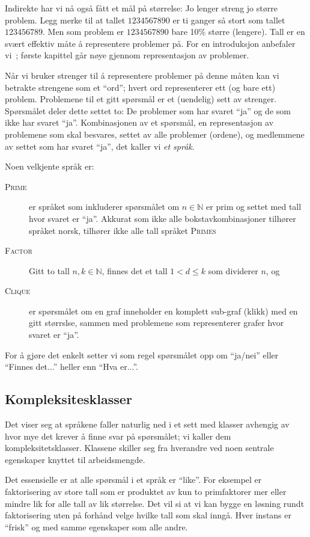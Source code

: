 \documentclass[a4paper, parskip=half]{scrartcl}
\theoremstyle{definition}
\begin{document}
Indirekte har vi nå også fått et mål på størrelse: Jo lenger streng jo
større problem.
Legg merke til at tallet $1234567890$ er ti ganger så
stort som tallet $123456789$.  Men som problem er $1234567890$ bare
10\% større (lengere).  Tall er en svært effektiv måte å representere
problemer på.
For en introduksjon anbefaler vi~\cite{AroraBarak2009Complexity};
første kapittel går nøye gjennom representasjon av problemer.

Når vi bruker strenger til å representere problemer på denne måten kan
vi betrakte strengene som et ``ord''; hvert ord representerer ett
(og bare ett) problem.  
Problemene til et gitt spørsmål er et (uendelig) sett av strenger.
Spørsmålet deler dette settet to: De problemer som har svaret ``ja''
og de som ikke har svaret ``ja''.
Kombinasjonen av et spørsmål, en representasjon av problemene som skal
besvares, settet av alle problemer (ordene), og medlemmene av settet
som har svaret ``ja'', det kaller vi \emph{et språk}.

Noen velkjente språk er:
\begin{description}
\item [\textsc{Prime}] er språket som inkluderer spørsmålet om $n \in
  \mathbb{N}$ er prim 
  og settet med tall hvor svaret er ``ja''.
  Akkurat som ikke alle bokstavkombinasjoner tilhører språket norsk,
  tilhører ikke alle tall språket \textsc{Primes}
\item [\textsc{Factor}]  Gitt to tall $n,k\in\mathbb{N}$, finnes det
  et tall  $1 < d \leq k$ som dividerer $n$, og
\item [\textsc{Clique}] er spørsmålet om en graf inneholder en komplett
  sub-graf (klikk) med en gitt størrslse, sammen med problemene som
  representerer grafer hvor svaret er ``ja''.
\end{description}
For å gjøre det enkelt setter vi som regel spørsmålet opp om
``ja/nei'' eller ``Finnes det...'' heller enn ``Hva er...''.


\subsection{Kompleksitesklasser}

Det viser seg at språkene faller naturlig ned i et sett med klasser
avhengig av hvor mye det krever å finne svar på spørsmålet;
vi kaller dem kompleksitetsklasser.  Klassene skiller seg fra
hverandre ved noen sentrale egenskaper knyttet til arbeidsmengde.

Det essensielle er at alle spørsmål i et språk er ``like''.  For
eksempel er faktorisering av store tall som er produktet av kun to
primfaktorer mer eller mindre lik for alle tall av lik størrelse.  Det
vil si at vi kan bygge en løsning rundt faktorisering uten på forhånd
velge hvilke tall som skal inngå.  Hver instans er ``frisk'' og med
samme egenskaper som alle andre.
\end{document}
